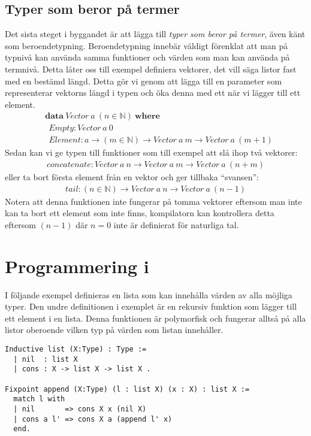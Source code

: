 \subsection{Typer som beror på termer}
Det sista steget i byggandet är att lägga till \emph{typer som beror på
termer}, även känt som beroendetypning. Beroendetypning innebär väldigt
förenklat att man på typnivå kan använda samma funktioner och värden som man
kan använda på termnivå. Detta låter oss till exempel definiera vektorer, det
vill säga listor fast med en bestämd längd. Detta gör vi genom att lägga till
en parameter som representerar vektorns längd i typen och öka denna med ett när
vi lägger till ett element.
\begin{align*}
  &\boldsymbol{data}\ Vector\ a\ (n \in \mathbb{N})\ \boldsymbol{where} \\
  &\ \ Empty : Vector\ a\ 0 \\
  &\ \ Element : a \to (m \in \mathbb{N}) \to Vector\ a\ m \to Vector\ a\ (m+1)
\end{align*}
Sedan kan vi ge typen till funktioner som till exempel att slå ihop två
vektorer:
\begin{align*}
  concatenate : Vector\ a\ n \to Vector\ a\ m \to Vector\ a\ (n+m)
\end{align*}
eller ta bort första element från en vektor och ger tillbaka ``svansen'':
\begin{align*}
  tail : (n \in \mathbb{N}) \to Vector\ a\ n \to Vector\ a\ (n-1)
\end{align*}
Notera att denna funktionen inte fungerar på tomma vektorer eftersom man inte
kan ta bort ett element som inte finns, kompilatorn kan kontrollera detta
eftersom $(n-1)$ där $n=0$ inte är definierat för naturliga tal.

\section{Programmering i \coq}
I följande exempel definieras en lista som kan innehålla värden av alla möjliga
typer. Den undre definitionen i exemplet är en rekursiv funktion som lägger
till ett element i en lista. Denna funktionen är polymorfisk och fungerar
alltså på alla listor oberoende vilken typ på värden som listan innehåller.
\begin{lstlisting}
Inductive list (X:Type) : Type :=
  | nil  : list X
  | cons : X -> list X -> list X .

Fixpoint append (X:Type) (l : list X) (x : X) : list X :=
  match l with
  | nil       => cons X x (nil X)
  | cons a l' => cons X a (append l' x)
  end.
\end{lstlisting}


